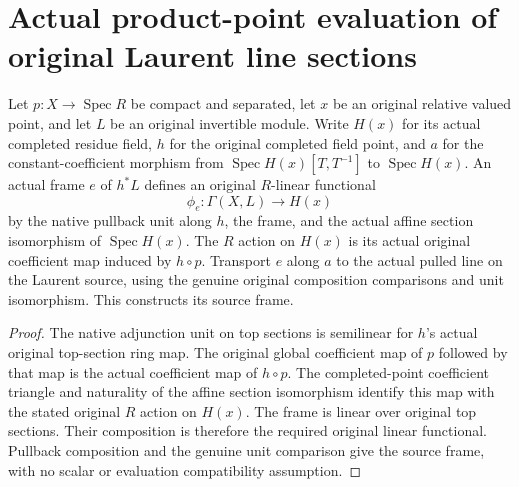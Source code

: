 \section{Actual product-point evaluation of original Laurent line sections}

\begin{definition}\label{def:fc-point-laurent-line-evaluation}
\leanok
{}
Let $p:X\to\operatorname{Spec}R$ be compact and separated, let $x$ be
an original relative valued point, and let $L$ be an original invertible
module. Write $H(x)$ for its actual completed residue field, $h$ for
the original completed field point, and $a$ for the constant-coefficient
morphism from $\operatorname{Spec}H(x)[T,T^{-1}]$ to
$\operatorname{Spec}H(x)$. An actual frame $e$ of $h^*L$ defines an
original $R$-linear functional
\[
 \phi_e:\Gamma(X,L)\longrightarrow H(x)
\]
by the native pullback unit along $h$, the frame, and the actual affine
section isomorphism of $\operatorname{Spec}H(x)$. The $R$ action on
$H(x)$ is its actual original coefficient map induced by $h\circ p$.
Transport $e$ along $a$ to the actual pulled line on the Laurent
source, using the genuine original composition comparisons and unit
isomorphism. This constructs its source frame.
\end{definition}
\begin{proof}
The native adjunction unit on top sections is semilinear for $h$'s
actual original top-section ring map. The original global coefficient
map of $p$ followed by that map is the actual coefficient map of
$h\circ p$. The completed-point coefficient triangle and naturality
of the affine section isomorphism identify this map with the stated
original $R$ action on $H(x)$. The frame is linear over original top
sections. Their composition is therefore the required original
linear functional. Pullback composition and the genuine unit
comparison give the source frame, with no scalar or evaluation
compatibility assumption.
\end{proof}

